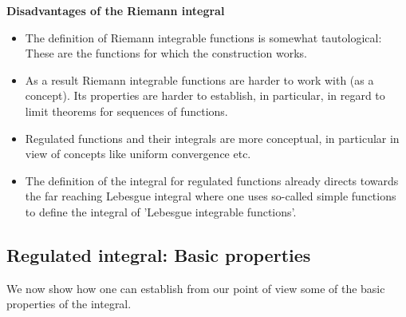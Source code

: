 \documentclass[10pt, a4paper]{article}
\begin{document}
\textbf{Disadvantages of the Riemann integral}
\begin{itemize}
    \item The definition of Riemann integrable functions is somewhat tautological:
    These are the functions for which the construction works.
    
    \item As a result Riemann integrable functions are harder to work with
    (as a concept).
    Its properties are harder to establish,
    in particular,
    in regard to limit theorems for sequences of functions.

    \item Regulated functions and their integrals are more conceptual,
    in particular in view of concepts like uniform convergence etc.

    \item The definition of the integral for regulated functions already directs towards the far reaching Lebesgue integral where one uses so-called simple functions to define the integral of 'Lebesgue integrable functions'.
\end{itemize}

\subsection{Regulated integral: Basic properties}
We now show how one can establish from our point of view some of the basic properties of the integral.
\end{document}
